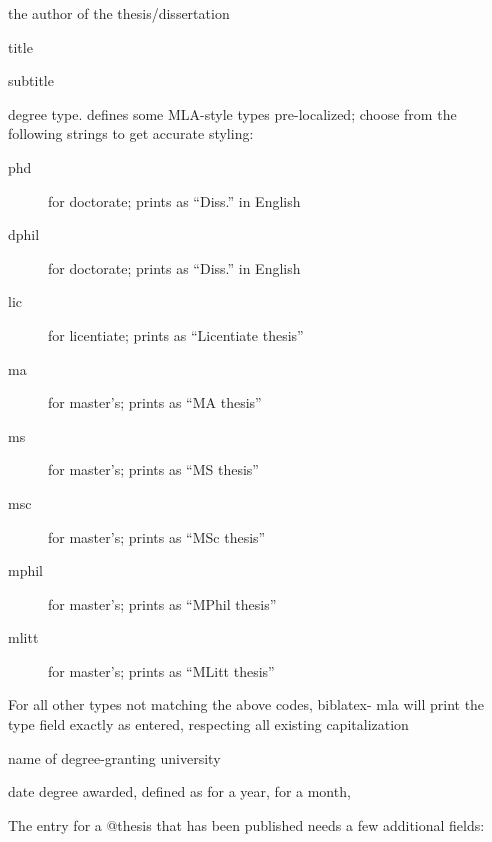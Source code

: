 \documentclass{ltxdockit}[2011/03/25]
\newcommand*{\Biblatexmla}{\sty{Biblatex-mla}\xspace}
\newenvironment*{optionslistNOT}
  {\list{}{%
     \setlength{\labelwidth}{\marglistwidth}%
     \setlength{\labelsep}{\marglistsep}%
     \setlength{\leftmargin}{50pt}%
     \renewcommand*{\makelabel}[1]{\hss\marglistfont##1}}%
   \def\optionitem##1{%
     \item[{\textbf{##1}}]}}
  {\endlist}
\begin{document}
\begin{optionslistNOT}

	\optionitem{author}
	
	the author of the thesis/dissertation
	
	\optionitem{title}
	
	title
	
	\optionitem{subtitle}
	
	subtitle
	
	\optionitem{type}
	
	degree type. \Biblatexmla defines some MLA-style  types pre-localized; choose from the following strings to get accurate styling:
	\begin{description}
		\item[phd] for doctorate; prints as ``Diss.'' in English
		\item[dphil] for doctorate; prints as ``Diss.'' in English
		\item[lic] for licentiate; prints as ``Licentiate thesis''
		\item[ma] for master's; prints as ``MA thesis''
		\item[ms] for master's; prints as ``MS thesis''
		\item[msc] for master's; prints as ``MSc thesis''
		\item[mphil] for master's; prints as ``MPhil thesis''
		\item[mlitt] for master's; prints as ``MLitt thesis''
	\end{description}
	
	For all other types not matching the above codes, biblatex- mla will print the type field exactly as entered, respecting all existing capitalization
	
	\optionitem{institution}
	
	name of degree-granting university
	
	\optionitem{date}
	
	date degree awarded, defined as  for a year,  for a month, 

\end{optionslistNOT}

The entry for a @thesis that has been published needs a few additional fields:
\end{document}
